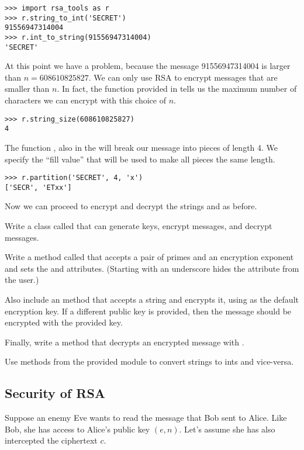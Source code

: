 \begin{lstlisting}
>>> import rsa_tools as r
>>> r.string_to_int('SECRET')
91556947314004
>>> r.int_to_string(91556947314004)
'SECRET'
\end{lstlisting}

At this point we have a problem, because the message 91556947314004 is larger than $n=608610825827$.
We can only use RSA to encrypt messages that are smaller than $n$.
In fact, the function  provided in  tells us the maximum number of characters we can encrypt with this choice of $n$.

\begin{lstlisting}
>>> r.string_size(608610825827)
4
\end{lstlisting}

The function , also in the  will break our message into pieces of length 4.
We specify the ``fill value''  that will be used to make all pieces the same length.

\begin{lstlisting}
>>> r.partition('SECRET', 4, 'x')
['SECR', 'ETxx']
\end{lstlisting}
Now we can proceed to encrypt and decrypt the strings  and  as before.

\begin{problem}
Write a class called  that can generate keys, encrypt messages, and decrypt messages.

Write a method called  that accepts a pair of primes and an encryption exponent and sets the  and  attributes.
(Starting  with an underscore hides the attribute from the user.)

Also include an  method that accepts a string and encrypts it, using  as the default encryption key.
If a different public key is provided, then the message should be encrypted with the provided key.

Finally, write a  method that decrypts an encrypted message with .

Use methods from the provided  module to convert strings to ints and vice-versa.
\label{prob:rsa1}
\end{problem}

\subsection*{Security of RSA}
Suppose an enemy Eve wants to read the message that Bob sent to Alice.
Like Bob, she has access to Alice's public key $(e, n)$.
Let's assume she has also intercepted the ciphertext $c$.

